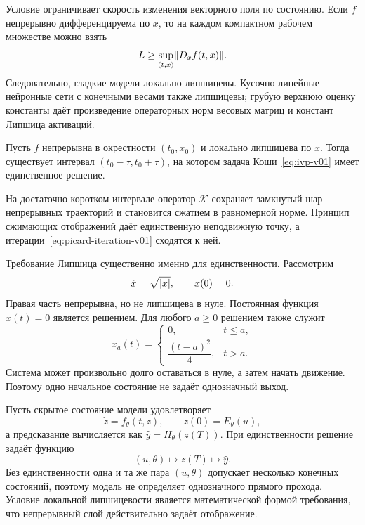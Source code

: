 Условие ограничивает скорость изменения векторного поля по состоянию. Если $f$ непрерывно дифференцируема по $x$, то на каждом компактном рабочем множестве можно взять
\[
L
\geq
\sup_{(t,x)}\lVert D_xf(t,x)\rVert.
\]
Следовательно, гладкие модели локально липшицевы. Кусочно-линейные нейронные сети с конечными весами также липшицевы; грубую верхнюю оценку константы даёт произведение операторных норм весовых матриц и констант Липшица активаций.

\begin{theorem}
\label{thm:picard-lindelof-v01}
Пусть $f$ непрерывна в окрестности $(t_0,x_0)$ и локально липшицева по $x$. Тогда существует интервал $(t_0-\tau,t_0+\tau)$, на котором задача Коши~\eqref{eq:ivp-v01} имеет единственное решение.
\end{theorem}

\begin{proofidea}
На достаточно коротком интервале оператор $\mathcal K$ сохраняет замкнутый шар непрерывных траекторий и становится сжатием в равномерной норме. Принцип сжимающих отображений даёт единственную неподвижную точку, а итерации~\eqref{eq:picard-iteration-v01} сходятся к ней.
\end{proofidea}

Требование Липшица существенно именно для единственности. Рассмотрим
\begin{equation}
\label{eq:nonunique-sqrt-v01}
\dot x=\sqrt{\lvert x\rvert},
\qquad
x(0)=0.
\end{equation}
Правая часть непрерывна, но не липшицева в нуле. Постоянная функция $x(t)=0$ является решением. Для любого $a\geq0$ решением также служит
\[
x_a(t)
=
\begin{cases}
0, & t\leq a,\\[2mm]
\dfrac{(t-a)^2}{4}, & t>a.
\end{cases}
\]
Система может произвольно долго оставаться в нуле, а затем начать движение. Поэтому одно начальное состояние не задаёт однозначный выход.

\begin{mlconnection}
Пусть скрытое состояние модели удовлетворяет
\[
\dot z=f_\theta(t,z),
\qquad
z(0)=E_\theta(u),
\]
а предсказание вычисляется как $\widehat y=H_\theta(z(T))$. При единственности решение задаёт функцию
\[
(u,\theta)\longmapsto z(T)\longmapsto\widehat y.
\]
Без единственности одна и та же пара $(u,\theta)$ допускает несколько конечных состояний, поэтому модель не определяет однозначного прямого прохода. Условие локальной липшицевости является математической формой требования, что непрерывный слой действительно задаёт отображение.
\end{mlconnection}

